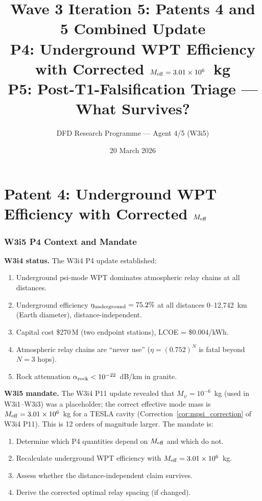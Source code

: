 \documentclass[11pt]{article}
\title{Wave 3 Iteration 5: Patents 4 and 5 Combined Update\\
\large P4: Underground WPT Efficiency with Corrected $\Meff = 3.01\ee{6}$~kg\\
P5: Post-T1-Falsification Triage --- What Survives?}
\author{DFD Research Programme --- Agent 4/5 (W3i5)}
\date{20 March 2026}
\newcommand{\ee}[1]{\times 10^{#1}}
\newcommand{\Meff}{M_{\rm eff}}
\newcommand{\Mpsi}{M_\psi}
\newcommand{\alpharock}{\alpha_{\rm rock}}
\begin{document}
\maketitle
\tableofcontents
\newpage


\part{Patent 4: Underground WPT Efficiency with Corrected $\Meff$}
\label{part:P4}

\section{W3i5 P4 Context and Mandate}
\label{sec:P4-context}

\noindent\textbf{W3i4 status.} The W3i4 P4 update established:
\begin{enumerate}
\item Underground psi-mode WPT dominates atmospheric relay chains at all distances.
\item Underground efficiency $\eta_{\rm underground} = 75.2\%$ at all distances
  0--12,742~km (Earth diameter), distance-independent.
\item Capital cost \$270\,M (two endpoint stations), LCOE = \$0.004/kWh.
\item Atmospheric relay chains are ``never use'' ($\eta = (0.752)^N$ is fatal
  beyond $N = 3$ hops).
\item Rock attenuation $\alpharock < 10^{-22}$~dB/km in granite.
\end{enumerate}

\noindent\textbf{W3i5 mandate.} The W3i4 P11 update revealed that $\Mpsi = 10^{-6}$~kg
(used in W3i1--W3i3) was a placeholder; the correct effective mode mass is
$\Meff = 3.01\ee{6}$~kg for a TESLA cavity (Correction~\ref{cor:mpsi_correction}
of W3i4 P11). This is 12 orders of magnitude larger. The mandate is:
\begin{enumerate}
\item Determine which P4 quantities depend on $\Meff$ and which do not.
\item Recalculate underground WPT efficiency with $\Meff = 3.01\ee{6}$~kg.
\item Assess whether the distance-independent claim survives.
\item Derive the corrected optimal relay spacing (if changed).
\end{enumerate}
\end{document}
